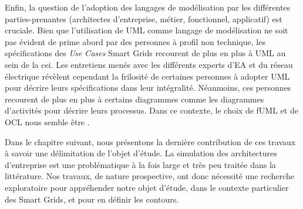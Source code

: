     Enfin, la question de l'adoption des langages de modélisation par les différentes parties-prenantes (architectes
    d'entreprise, métier, fonctionnel, applicatif) est cruciale. Bien que l'utilisation de UML comme
    langage de modélisation ne soit pas évident de prime abord par des personnes à profil non technique,
    les spécifications des \textit{Use Cases} Smart Grids recourent de plus en plus à UML au sein de la \gls{cei}.
    Les entretiens menés avec les différents experts d'EA et du réseau électrique révèlent cependant la frilosité
    de certaines personnes à adopter UML pour décrire leurs spécifications dans leur intégralité. Néanmoins, ces
    personnes recourent de plus en plus à certains diagrammes comme les diagrammes d'activités pour décrire
    leurs processus. Dans ce contexte, le choix de fUML et de OCL nous semble être .

    Dans le chapitre suivant, nous présentons la dernière contribution de ces travaux à savoir
    une délimitation de l'objet d'étude. La simulation des architectures d'entreprise est une problématique à la
    fois large et très peu traitée dans la littérature. Nos travaux, de nature prospective, ont donc nécessité
    une recherche exploratoire pour appréhender notre objet d'étude, dans le contexte particulier des
    Smart Grids, et pour en définir les contours. 






